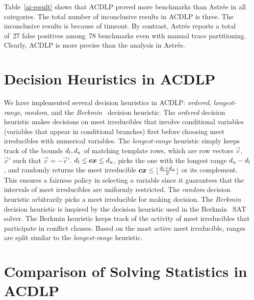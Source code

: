 Table~\ref{ai-result} shows that ACDLP proved more benchmarks than
Astr{\'e}e in all categories.  The total number of inconclusive results in
ACDLP is three.  The inconclusive results is because of timeout.  By
contrast, Astr{\'e}e reports a total of~27 false positives among~78
benchmarks even with manual trace partitioning.  Clearly, ACDLP is more
precise than the analysis in Astr{\'e}e.
%
%
\section{Decision Heuristics in ACDLP}
%
We have implemented several decision heuristics in ACDLP: {\em ordered}, 
{\em longest-range}, {\em random}, and the {\em Berkmin}~\cite{eugoldberg07} 
decision heuristic.  The {\em ordered} decision heuristic 
makes decisions on meet irreducibles that involve conditional 
variables (variables that appear in conditional branches) first 
before choosing meet irreducibles with numerical variables.  
%
The {\em longest-range} heuristic simply keeps track of the bounds
$d_l,d_u$ of matching template rows, which are 
row vectors $\vec{c}$, $\vec{c}'$ such that $\vec{c}=-\vec{c}'$.
$d_l\leq {\boldsymbol c}{\boldsymbol x}\leq d_u$, picks the one with the longest range
$d_u-d_l$, and randomly returns the meet irreducible
${\boldsymbol c}{\boldsymbol x}\leq
\lfloor\frac{d_l+d_u}{2}\rfloor$ or its
complement. This ensures a fairness policy in selecting a variable
since it guarantees that the intervals of meet irreducibles are
uniformly restricted.
%
The {\em random} decision heuristic arbitrarily picks a meet irreducible  
for making decision. 
%
%
The {\em Berkmin} decision heuristic is inspired by the 
decision heuristic used in the Berkmin~\cite{eugoldberg07} SAT solver.  
The Berkmin heuristic %
keeps track of the activity of %
meet irreducibles that participate in conflict clauses. 
Based on the most active meet irreducible, ranges are split 
similar to the {\em longest-range} heuristic.
%
\section{Comparison of Solving Statistics in ACDLP}
%

%
